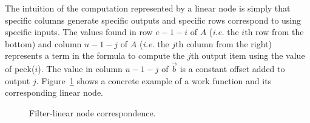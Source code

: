 The intuition of the computation represented by a linear node is
simply that specific columns generate specific outputs and specific
rows correspond to using specific inputs.  The values found in row
$e-1-i$ of $A$ ({\it i.e.} the $i$th row from the bottom) and 
column $u-1-j$ of $A$ ({\it i.e.} the $j$th column from the right) 
represents a term in the formula to compute the $j$th output item using 
the value of peek($i$). The value in column $u-1-j$ of 
$\vec{b}$ is a constant offset added to output $j$.
Figure~\ref{fig:linear-node-example} shows a concrete example
of a work function and its corresponding linear node.

\begin{figure}
\center
\epsfxsize=2.0in
\vspace{-12pt}
\caption{Filter-linear node correspondence.}
\label{fig:linear-node-example}
\vspace{-12pt}
\end{figure}
